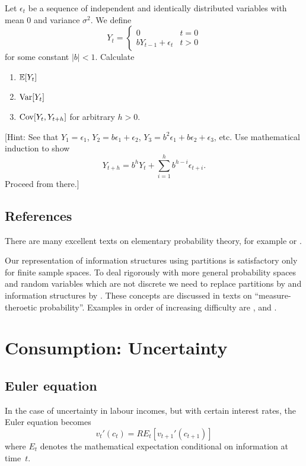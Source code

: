 \documentclass[11pt,reqno,openany]{amsbook}
\begin{document}
\begin{exercises}
    \item Let $\epsilon_t$ be a sequence of independent and
      identically distributed variables with mean $0$ and
      variance $\sigma^2$. We define
      \[Y_t = 
      \begin{cases}
        0 & t=0\\
        bY_{t-1} + \epsilon_t & t>0
        \end{cases}\] 
      for some constant $|b|<1$. Calculate
      \begin{enumerate}
      \item $\mathbb{E}[Y_t]$
      \item $\operatorname{Var}[Y_t]$
      \item $\operatorname{Cov}[Y_t,Y_{t+h}]$ for arbitrary $h>0$.
      \end{enumerate}

      [Hint: See that $Y_1 = \epsilon_1$, $Y_2 =
      b\epsilon_1 + \epsilon_2$, $Y_3 = b^2\epsilon_1 +
      b \epsilon_2 + \epsilon_3$, etc. Use mathematical
      induction to show
      \[Y_{t+h} = b^h Y_t+\sum_{i=1}^h b^{h-i} \epsilon_{t+i}.\]
      Proceed from there.]
\end{exercises}

\section*{References}
There are many excellent texts on elementary probability
theory, for example \cite{chung-elementary} or
\cite{ross-probability}.

Our representation of information structures using
partitions is satisfactory only for finite sample spaces. To
deal rigorously with more general probability spaces and
random variables which are not discrete we need to replace
partitions by  and information
structures by . These concepts are
discussed in texts on ``measure-theroetic
probability''. Examples in order of increasing difficulty
are \cite{jacod-protter-essentials},
\cite{williams1991probability} and
\cite{billingsley-prob-measure}.





\chapter{Consumption: Uncertainty}\label{ch:cons-uncertain}
\section{Euler equation}
In the case of uncertainty in labour incomes, but with certain
interest rates, the Euler equation becomes
\begin{equation}\label{eq:euler-uncertain}
v_t'(c_t)=RE_t[v_{t+1}'(c_{t+1})]
\end{equation}
where $E_t$ denotes the mathematical expectation conditional on information at time~$t$.
\end{document}
